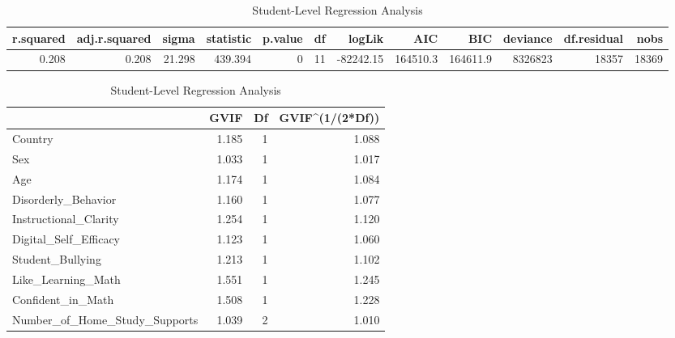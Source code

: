 \documentclass[
  letterpaper,
  DIV=11,
  numbers=noendperiod]{scrartcl}
\begin{document}
\begin{longtable}[t]{rrrrrrrrrrrr}

\caption{\label{tbl-Initial-regression-for-student-data}Student-Level
Regression Analysis}

\tabularnewline

\toprule
r.squared & adj.r.squared & sigma & statistic & p.value & df & logLik & AIC & BIC & deviance & df.residual & nobs\\
\midrule
0.208 & 0.208 & 21.298 & 439.394 & 0 & 11 & -82242.15 & 164510.3 & 164611.9 & 8326823 & 18357 & 18369\\
\bottomrule

\end{longtable}

\begin{longtable}[t]{lrrr}

\caption{\label{tbl-Initial-regression-for-student-data}Student-Level
Regression Analysis}

\tabularnewline

\toprule
 & GVIF & Df & GVIF\textasciicircum{}(1/(2*Df))\\
\midrule
Country & 1.185 & 1 & 1.088\\
Sex & 1.033 & 1 & 1.017\\
Age & 1.174 & 1 & 1.084\\
Disorderly\_Behavior & 1.160 & 1 & 1.077\\
Instructional\_Clarity & 1.254 & 1 & 1.120\\
\addlinespace
Digital\_Self\_Efficacy & 1.123 & 1 & 1.060\\
Student\_Bullying & 1.213 & 1 & 1.102\\
Like\_Learning\_Math & 1.551 & 1 & 1.245\\
Confident\_in\_Math & 1.508 & 1 & 1.228\\
Number\_of\_Home\_Study\_Supports & 1.039 & 2 & 1.010\\
\bottomrule

\end{longtable}
\end{document}
